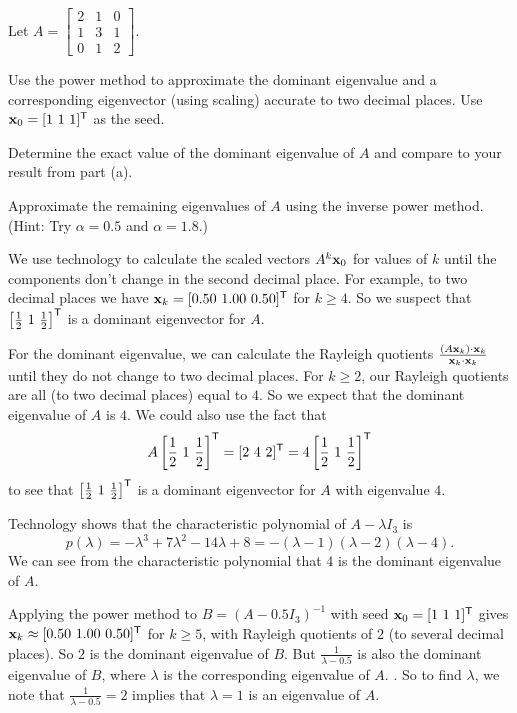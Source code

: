 \begin{example} Let $A = \left[ \begin{array}{ccc} 2&1&0 \\ 1&3&1 \\ 0&1&2 \end{array} \right]$.
\ba
\item Use the power method to approximate the dominant eigenvalue and a corresponding eigenvector (using scaling) accurate to two decimal places. Use $\mathbf{x}_0 = [1 \ 1 \ 1]^{\mathsf{T}}$ as the seed.

\item Determine the exact value of the dominant eigenvalue of $A$ and compare to your result from part (a).

\item Approximate the remaining eigenvalues of $A$ using the inverse power method. (Hint: Try $\alpha = 0.5$ and $\alpha = 1.8$.)

\ea

\ExampleSolution
\ba
\item We use technology to calculate the scaled vectors $A^k \mathbf{x}_0$ for values of $k$ until the components don't change in the second decimal place. For example, to two decimal places we have $\mathbf{x}_k = [0.50 \ 1.00 \ 0.50]^{\mathsf{T}}$ for $k \geq 4$. So we suspect that $\left[ \frac{1}{2} \ 1 \ \frac{1}{2} \right]^{\tr}$ is a dominant eigenvector for $A$. 

For the dominant eigenvalue, we can calculate the Rayleigh quotients $\frac{(A\mathbf{x}_k) \cdot \mathbf{x}_k}{\mathbf{x}_k \cdot \mathbf{x}_k}$ until they do not change to two decimal places. For $k \geq 2$, our Rayleigh quotients are all (to two decimal places) equal to $4$. So we expect that the dominant eigenvalue of $A$ is $4$. We could also use the fact that 
\[A \left[ \frac{1}{2} \ 1 \ \frac{1}{2} \right]^{\mathsf{T}} = [2 \ 4 \ 2]^{\mathsf{T}} = 4\left[ \frac{1}{2} \ 1 \ \frac{1}{2} \right]^{\mathsf{T}} \]
to see that $\left[ \frac{1}{2} \ 1 \ \frac{1}{2} \right]^{\tr}$ is a dominant eigenvector for $A$ with eigenvalue $4$. 

\item Technology shows that the characteristic polynomial of $A - \lambda I_3$ is 
\[p(\lambda) = -\lambda^3 + 7\lambda^2 - 14 \lambda + 8 = -(\lambda-1)(\lambda-2)(\lambda-4).\]
We can see from the characteristic polynomial that $4$ is the dominant eigenvalue of $A$. 

\item Applying the power method to $B = (A-0.5I_3)^{-1}$ with seed $\mathbf{x}_0 = [1 \ 1 \ 1]^{\mathsf{T}}$ gives $\vx_k \approx [ 0.50 \ 1.00 \ 0.50]^{\tr}$ for $k \geq 5$, with Rayleigh quotients of $2$ (to several decimal places). So $2$ is the dominant eigenvalue of $B$. But $\frac{1}{\lambda-0.5}$ is also the dominant eigenvalue of $B$, where $\lambda$ is the corresponding eigenvalue of $A$. . So to find $\lambda$, we note that $\frac{1}{\lambda-0.5} = 2$ implies that $\lambda = 1$ is an eigenvalue of $A$.  


\end{example}
